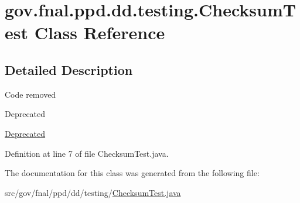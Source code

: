 \hypertarget{classgov_1_1fnal_1_1ppd_1_1dd_1_1testing_1_1ChecksumTest}{\section{gov.\-fnal.\-ppd.\-dd.\-testing.\-Checksum\-Test Class Reference}
\label{classgov_1_1fnal_1_1ppd_1_1dd_1_1testing_1_1ChecksumTest}
}


\subsection{Detailed Description}
Code removed \begin{DoxyRefDesc}{Deprecated}
\item[\hyperlink{deprecated__deprecated000003}{Deprecated}]\end{DoxyRefDesc}


Definition at line 7 of file Checksum\-Test.\-java.



The documentation for this class was generated from the following file\-:\begin{DoxyCompactItemize}
\item 
src/gov/fnal/ppd/dd/testing/\hyperlink{ChecksumTest_8java}{Checksum\-Test.\-java}\end{DoxyCompactItemize}

